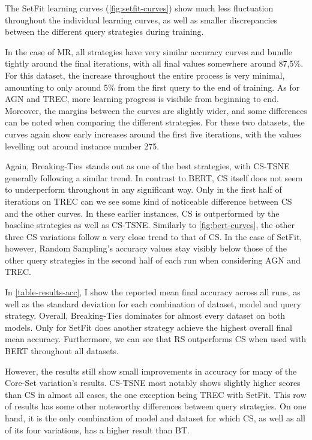 \documentclass[english,bachelor,ul]{webisthesis} %
\begin{document}
The SetFit learning curves (\ref{fig:setfit-curves}) show much less fluctuation throughout the individual learning curves, as well as smaller discrepancies between the different query strategies during training. 

In the case of MR, all strategies have very similar accuracy curves and bundle tightly around the final iterations, with all final values somewhere around 87,5\%. For this dataset, the increase throughout the entire process is very minimal, amounting to only around 5\% from the first query to the end of training. As for AGN and TREC, more learning progress is visibile from beginning to end. Moreover, the margins between the curves are slightly wider, and some differences can be noted when comparing the different strategies. For these two datasets, the curves again show early increases around the first five iterations, with the values levelling out around instance number 275. 

Again, Breaking-Ties stands out as one of the best strategies, with CS-TSNE generally following a similar trend. In contrast to BERT, CS itself does not seem to underperform throughout in any significant way. Only in the first half of iterations on TREC can we see some kind of noticeable difference between CS and the other curves. In these earlier instances, CS is outperformed by the baseline strategies as well as CS-TSNE. Similarly to \ref{fig:bert-curves}, the other three CS variations follow a very close trend to that of CS. In the case of SetFit, however, Random Sampling's accuracy values stay visibly below those of the other query strategies in the second half of each run when considering AGN and TREC.

In \ref{table-results-acc}, I show the reported mean final accuracy across all runs, as well as the standard deviation for each combination of dataset, model and query strategy. Overall, Breaking-Ties dominates for almost every dataset on both models. Only for SetFit does another strategy achieve the highest overall final mean accuracy. Furthermore, we can see that RS outperforms CS when used with BERT throughout all datasets.

However, the results still show small improvements in accuracy for many of the Core-Set variation's results. CS-TSNE most notably shows slightly higher scores than CS in almost all cases, the one exception being TREC with SetFit. This row of results has some other noteworthy differences between query strategies. On one hand, it is the only combination of model and dataset for which CS, as well as all of its four variations, has a higher result than BT. 
\end{document}
